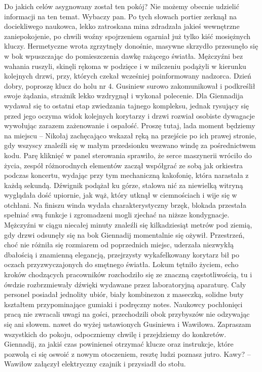 \documentclass[../MAIN.tex]{subfiles}
\begin{document}
% 
\sx Do jakich celów asygnowany został ten pokój? 
\xx Nie możemy obecnie udzielić informacji na ten temat. Wybaczy pan.
\qd
Po tych słowach portier zerknął na dociekliwego naukowca, lekko zatroskana mina zdradzała jakieś wewnętrzne zaniepokojenie, po chwili woźny spojrzeniem ogarniał już tylko kiść mosiężnych kluczy. Hermetyczne wrota zgrzytnęły donośnie, masywne skrzydło przesunęło się w bok wpuszczając do pomieszczenia dawkę rażącego światła. Mężczyźni bez wahania ruszyli, skinęli rękoma w podzięce i w milczeniu podążyli w kierunku kolejnych drzwi, przy, których czekał wcześniej poinformowany nadzorca. 
% 
\sx Dzień dobry, poproszę klucz do holu nr 4.
\qd
Gusiniew surowo zakomunikował i podkreślił swoje żądania, strażnik lekko wzdrygnął i wykonał polecenie. Dla Giennadija wydawał się to ostatni etap zwiedzania tajnego kompleksu, jednak rysujący się przed jego oczyma widok kolejnych korytarzy i drzwi rozwiał osobiste dywagacje wywołując zarazem zażenowanie i ospałość. 
% 
\sx Proszę tutaj, lada moment będziemy na miejscu -- Nikołaj zachęcająco wskazał ręką na przejście po ich prawej stronie, gdy wszyscy znaleźli się w małym przedsionku wezwano windę za pośrednictwem kodu. 
\qd
Parę kliknięć w panel sterowania sprawiło, że serce maszynerii wróciło do życia, zespół różnorodnych elementów zaczął współgrać ze sobą jak orkiestra podczas koncertu, wydając przy tym mechaniczną kakofonię, która narastała z każdą sekundą. Dźwignik podążał ku górze, stalowa nić za niewielką witryną wyglądała dość upiornie, jak wąż, który utknął w ciemnościach i wije się w otchłani. Na finiszu winda wydała charakterystyczny brzęk, blokada przestała spełniać swą funkcje i zgromadzeni mogli zjechać na niższe kondygnacje. Mężczyźni w ciągu niecałej minuty znaleźli się kilkadziesiąt metrów pod ziemią, gdy drzwi odsunęły się na bok Giennadij momentalnie się ożywił. Przestrzeń, choć nie różniła się rozmiarem od poprzednich miejsc, uderzała niezwykłą dbałością i znamienną elegancją, przejrzysty wykafelkowany 
korytarz bił po oczach przyzwyczajonych do smętnego światła. Lokum tętniło życiem, echo kroków chodzących pracowników rozchodziło się ze znaczną częstotliwością, tu i ówdzie rozbrzmiewały dźwięki wydawane przez laboratoryjną aparaturę. Cały personel posiadał jednolity ubiór, biały kombinezon z maseczką, solidne buty kształtem przypominające gumiaki i podręczny notes. Naukowcy pochłonięci pracą nie zwracali uwagi na gości, przechodzili obok przybyszów nie odzywając się ani słowem. nawet do wyżej ustawionych Gusiniewa i Wawiłowa. 
% 
\sx Zapraszam wszystkich do pokoju, odpoczniemy chwilę i przejdziemy do konkretów. Giennadij, za jakiś czas powinieneś otrzymać klucze oraz instrukcje, które pozwolą ci się oswoić z nowym otoczeniem, resztę ludzi poznasz jutro. Kawy? -- Wawiłow załączył elektryczny czajnik i przysiadł do stołu. 
\end{document}
